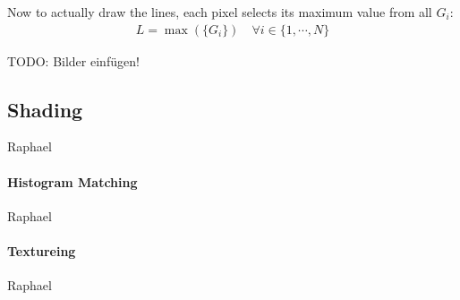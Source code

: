 Now to actually draw the lines, each pixel selects its maximum value from all
$G_i$:
\begin{align*}
 L = \max(\lbrace G_i\rbrace) \quad \forall i \in  \lbrace1,\cdots,N\rbrace
\end{align*}

TODO: Bilder einfügen!

\subsection{Shading}
Raphael
\paragraph{Histogram Matching}
Raphael

\paragraph{Textureing}
Raphael
